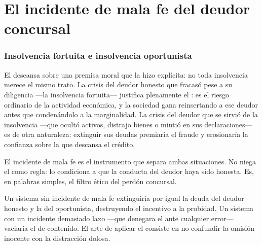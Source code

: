 \chapter{El incidente de mala fe del deudor concursal}
\label{cap:mala-fe}


\bloqueTeorico

\subsection{Insolvencia fortuita e insolvencia oportunista}

El \discharge{} descansa sobre una premisa moral que la \Lreforma{} \citeyearpar{ley-21563}
hizo explícita: no toda insolvencia merece el mismo trato. La crisis del deudor honesto que
fracasó pese a su diligencia ---la insolvencia fortuita--- justifica plenamente el
\freshstart{}: es el riesgo ordinario de la actividad económica, y la sociedad gana
reinsertando a ese deudor antes que condenándolo a la marginalidad. La crisis del deudor que
se sirvió de la insolvencia ---que ocultó activos, distrajo bienes o mintió en sus
declaraciones--- es de otra naturaleza: extinguir sus deudas premiaría el fraude y erosionaría
la confianza sobre la que descansa el crédito.

El incidente de mala fe es el instrumento que separa ambas situaciones. No niega el
\discharge{} como regla: lo condiciona a que la conducta del deudor haya sido honesta. Es,
en palabras simples, el filtro ético del perdón concursal.

\begin{foco}
Un sistema sin incidente de mala fe extinguiría por igual la deuda del deudor honesto y la del
oportunista, destruyendo el incentivo a la probidad. Un sistema con un incidente demasiado
laxo ---que denegara el \discharge{} ante cualquier error--- vaciaría el \freshstart{} de
contenido. El arte de aplicar el  consiste en no confundir la omisión inocente con
la distracción dolosa.
\end{foco}

